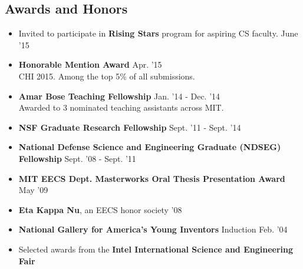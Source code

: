 \documentclass[margin]{res}
\begin{document}
\begin{resume}




\section{Awards and Honors} 

\begin{itemize}[leftmargin=*] \itemsep -2pt

\item Invited to participate in {\bf Rising Stars} program for aspiring CS faculty. \hfill June '15

\item {\bf Honorable Mention Award} \hfill Apr. '15
\\CHI 2015. Among the top 5\% of all submissions.

\item {\bf Amar Bose Teaching Fellowship} \hfill Jan. '14 - Dec. '14 \\Awarded to 3 nominated teaching assistants across MIT. 

\item {\bf NSF Graduate Research Fellowship} \hfill Sept. '11 - Sept. '14

\item {\bf National Defense Science and Engineering Graduate (NDSEG) \\ Fellowship} \hfill Sept. '08 - Sept. '11
          
\item {\bf MIT EECS Dept. Masterworks Oral Thesis Presentation Award} \hfill May '09   

\item {\bf Eta Kappa Nu}, an EECS honor society \hfill '08

\item {\bf National Gallery for America's Young Inventors} Induction \hfill Feb. '04

\item Selected awards from the {\bf Intel International Science and Engineering Fair}
\begin{itemize}[leftmargin=*] \itemsep -2pt




\end{itemize}
\end{itemize}
\end{resume}
\end{document}
